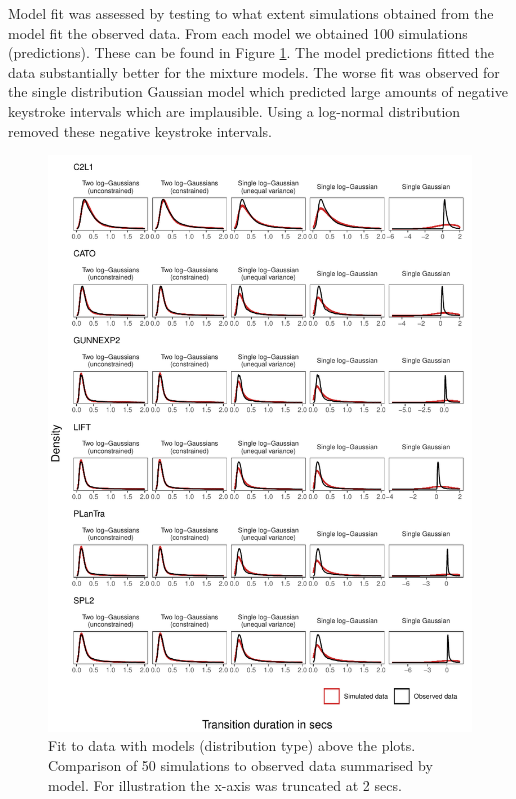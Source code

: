 \documentclass[
  man,floatsintext]{apa7}
\begin{document}
Model fit was assessed by testing to what extent simulations obtained from the model fit the observed data. From each model we obtained 100 simulations (predictions). These can be found in Figure \ref{fig:prediction}. The model predictions fitted the data substantially better for the mixture models. The worse fit was observed for the single distribution Gaussian model which predicted large amounts of negative keystroke intervals which are implausible. Using a log-normal distribution removed these negative keystroke intervals.

\begin{figure}

{\centering \includegraphics{figures/fitplots} 

}

\caption{Fit to data with models (distribution type) above the plots. Comparison of 50 simulations to observed data summarised by model. For illustration the x-axis was truncated at 2 secs.}\label{fig:prediction}
\end{figure}
\end{document}
